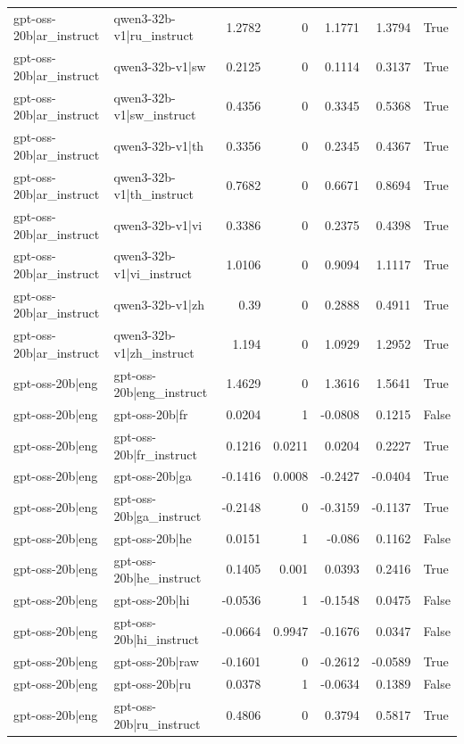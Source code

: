 \begin{table}
\begin{tabular}{l l r r r r l}
gpt-oss-20b|ar_instruct & qwen3-32b-v1|ru_instruct & 1.2782 & 0 & 1.1771 & 1.3794 & True \\
gpt-oss-20b|ar_instruct & qwen3-32b-v1|sw & 0.2125 & 0 & 0.1114 & 0.3137 & True \\
gpt-oss-20b|ar_instruct & qwen3-32b-v1|sw_instruct & 0.4356 & 0 & 0.3345 & 0.5368 & True \\
gpt-oss-20b|ar_instruct & qwen3-32b-v1|th & 0.3356 & 0 & 0.2345 & 0.4367 & True \\
gpt-oss-20b|ar_instruct & qwen3-32b-v1|th_instruct & 0.7682 & 0 & 0.6671 & 0.8694 & True \\
gpt-oss-20b|ar_instruct & qwen3-32b-v1|vi & 0.3386 & 0 & 0.2375 & 0.4398 & True \\
gpt-oss-20b|ar_instruct & qwen3-32b-v1|vi_instruct & 1.0106 & 0 & 0.9094 & 1.1117 & True \\
gpt-oss-20b|ar_instruct & qwen3-32b-v1|zh & 0.39 & 0 & 0.2888 & 0.4911 & True \\
gpt-oss-20b|ar_instruct & qwen3-32b-v1|zh_instruct & 1.194 & 0 & 1.0929 & 1.2952 & True \\
gpt-oss-20b|eng & gpt-oss-20b|eng_instruct & 1.4629 & 0 & 1.3616 & 1.5641 & True \\
gpt-oss-20b|eng & gpt-oss-20b|fr & 0.0204 & 1 & -0.0808 & 0.1215 & False \\
gpt-oss-20b|eng & gpt-oss-20b|fr_instruct & 0.1216 & 0.0211 & 0.0204 & 0.2227 & True \\
gpt-oss-20b|eng & gpt-oss-20b|ga & -0.1416 & 0.0008 & -0.2427 & -0.0404 & True \\
gpt-oss-20b|eng & gpt-oss-20b|ga_instruct & -0.2148 & 0 & -0.3159 & -0.1137 & True \\
gpt-oss-20b|eng & gpt-oss-20b|he & 0.0151 & 1 & -0.086 & 0.1162 & False \\
gpt-oss-20b|eng & gpt-oss-20b|he_instruct & 0.1405 & 0.001 & 0.0393 & 0.2416 & True \\
gpt-oss-20b|eng & gpt-oss-20b|hi & -0.0536 & 1 & -0.1548 & 0.0475 & False \\
gpt-oss-20b|eng & gpt-oss-20b|hi_instruct & -0.0664 & 0.9947 & -0.1676 & 0.0347 & False \\
gpt-oss-20b|eng & gpt-oss-20b|raw & -0.1601 & 0 & -0.2612 & -0.0589 & True \\
gpt-oss-20b|eng & gpt-oss-20b|ru & 0.0378 & 1 & -0.0634 & 0.1389 & False \\
gpt-oss-20b|eng & gpt-oss-20b|ru_instruct & 0.4806 & 0 & 0.3794 & 0.5817 & True \\

\end{tabular}
\end{table}
